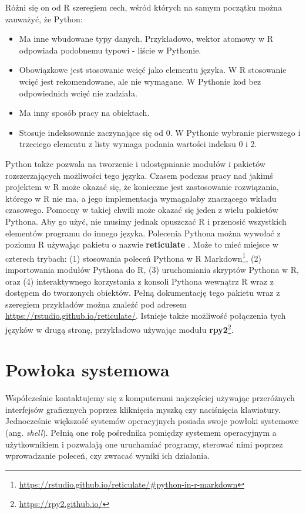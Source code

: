\documentclass[paper=6in:9in,pagesize=pdftex,headinclude=on,footinclude=on,10pt]{scrbook}
\DeclareRobustCommand{\href}[2]{#2\footnote{\url{#1}}}
\providecommand{\tightlist}{%
  \setlength{\itemsep}{0pt}\setlength{\parskip}{0pt}}
\begin{document}
Różni się on od R szeregiem cech, wśród których na samym początku można zauważyć, że Python:

\begin{itemize}
\tightlist
\item
  Ma inne wbudowane typy danych.
  Przykładowo, wektor atomowy w R odpowiada podobnemu typowi - liście w Pythonie.
\item
  Obowiązkowe jest stosowanie wcięć jako elementu języka.
  W R stosowanie wcięć jest rekomendowane, ale nie wymagane.
  W Pythonie kod bez odpowiednich wcięć nie zadziała.
\item
  Ma inny sposób pracy na obiektach.
\item
  Stosuje indeksowanie zaczynające się od 0.
  W Pythonie wybranie pierwszego i trzeciego elementu z listy wymaga podania wartości indeksu 0 i 2.
\end{itemize}

Python także pozwala na tworzenie i udostępnianie modułów i pakietów rozszerzających możliwości tego języka.
Czasem podczas pracy nad jakimś projektem w R może okazać się, że konieczne jest zastosowanie rozwiązania, którego w R nie ma, a jego implementacja wymagałaby znaczącego wkładu czasowego.
Pomocny w takiej chwili może okazać się jeden z wielu pakietów Pythona.
Aby go użyć, nie musimy jednak opuszczać R i przenosić wszystkich elementów programu do innego języka.
Polecenia Pythona można wywołać z poziomu R używając pakietu o nazwie \textbf{reticulate} \citep{R-reticulate}.
Może to mieć miejsce w czterech trybach: (1) stosowania poleceń \href{https://rstudio.github.io/reticulate/\#python-in-r-markdown}{Pythona w R Markdown}, (2) importowania modułów Pythona do R, (3) uruchomiania skryptów Pythona w R, oraz (4) interaktywnego korzystania z konsoli Pythona wewnątrz R wraz z dostępem do tworzonych obiektów.
Pełną dokumentację tego pakietu wraz z szeregiem przykładów można znaleźć pod adresem \url{https://rstudio.github.io/reticulate/}.
Istnieje także możliwość połączenia tych języków w drugą stronę, przykładowo używając \href{https://rpy2.github.io/}{modułu \textbf{rpy2}}.

\hypertarget{powloka-systemowa}{%
\section{Powłoka systemowa}\label{powloka-systemowa}}

Współcześnie kontaktujemy się z komputerami najczęściej używając przeróżnych interfejsów graficznych poprzez kliknięcia myszką czy naciśnięcia klawiatury.
Jednocześnie większość systemów operacyjnych posiada swoje powłoki systemowe (ang. \emph{shell}).
Pełnią one rolę pośrednika pomiędzy systemem operacyjnym a użytkownikiem i pozwalają one uruchamiać programy, sterować nimi poprzez wprowadzanie poleceń, czy zwracać wyniki ich działania.
\end{document}
